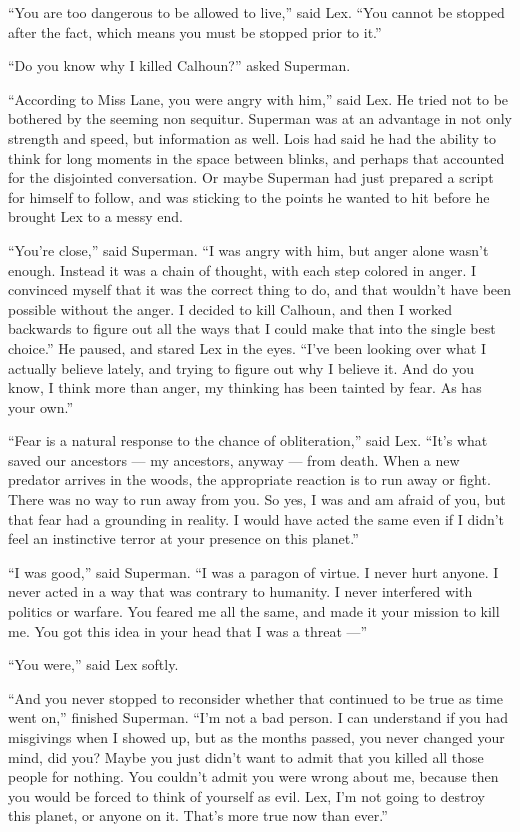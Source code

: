 ``You are too dangerous to be allowed to live,'' said Lex. ``You cannot
be stopped after the fact, which means you must be stopped prior to
it.''

``Do you know why I killed Calhoun?'' asked Superman.

``According to Miss Lane, you were angry with him,'' said Lex. He tried
not to be bothered by the seeming non sequitur. Superman was at an
advantage in not only strength and speed, but information as well. Lois
had said he had the ability to think for long moments in the space
between blinks, and perhaps that accounted for the disjointed
conversation. Or maybe Superman had just prepared a script for himself
to follow, and was sticking to the points he wanted to hit before he
brought Lex to a messy end.

``You're close,'' said Superman. ``I was angry with him, but anger alone
wasn't enough. Instead it was a chain of thought, with each step colored
in anger. I convinced myself that it was the correct thing to do, and
that wouldn't have been possible without the anger. I decided to kill
Calhoun, and then I worked backwards to figure out all the ways that I
could make that into the single best choice.'' He paused, and stared Lex
in the eyes. ``I've been looking over what I actually believe lately,
and trying to figure out why I believe it. And do you know, I think more
than anger, my thinking has been tainted by fear. As has your own.''

``Fear is a natural response to the chance of obliteration,'' said Lex.
``It's what saved our ancestors --- my ancestors, anyway --- from death.
When a new predator arrives in the woods, the appropriate reaction is to
run away or fight. There was no way to run away from you. So yes, I was
and am afraid of you, but that fear had a grounding in reality. I would
have acted the same even if I didn't feel an instinctive terror at your
presence on this planet.''

``I was good,'' said Superman. ``I was a paragon of virtue. I never hurt
anyone. I never acted in a way that was contrary to humanity. I never
interfered with politics or warfare. You feared me all the same, and
made it your mission to kill me. You got this idea in your head that I
was a threat ---''

``You were,'' said Lex softly.

``And you never stopped to reconsider whether that continued to be true
as time went on,'' finished Superman. ``I'm not a bad person. I can
understand if you had misgivings when I showed up, but as the months
passed, you never changed your mind, did you? Maybe you just didn't want
to admit that you killed all those people for nothing. You couldn't
admit you were wrong about me, because then you would be forced to think
of yourself as evil. Lex, I'm not going to destroy this planet, or
anyone on it. That's more true now than ever.''

